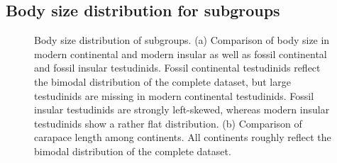 \subsection*{Body size distribution for subgroups}
\begin{center}
	\begin{figure}[H]
		\caption[Comparison of carapace lengths in subgroups]{Body size distribution of subgroups. (a) Comparison of body size in modern continental and modern insular as well as fossil continental and fossil insular testudinids. Fossil continental testudinids reflect the bimodal distribution of the complete dataset, but large testudinids are missing in modern continental testudinids. Fossil insular testudinids are strongly left-skewed, whereas modern insular testudinids show a rather flat distribution. (b) Comparison of carapace length among continents. All continents roughly reflect the bimodal distribution of the complete dataset.}
		\label{fig:HistRest}
	\end{figure}
\end{center}